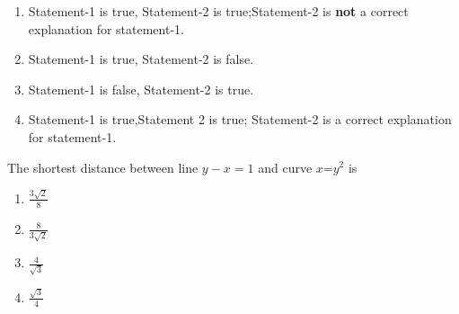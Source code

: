          
            \begin{enumerate}
            
                
            
                \item Statement-1 is true, Statement-2 is true;Statement-2 is \textbf{not} a correct explanation for statement-1. 
        \item Statement-1 is true, Statement-2 is false.  
        \item Statement-1 is false, Statement-2 is true.  
        \item Statement-1 is true,Statement 2 is true; Statement-2 is a correct explanation for statement-1. 
    
        
            \end{enumerate}
           
            
 \item The shortest distance between line $y-x=1$ and curve $x$=$y^2$ is \hfill{}
             \begin{multicols}{4}
            \begin{enumerate}
            
                
    \item $\frac{3\sqrt{2}}{8}$
        \item $\frac{8}{3\sqrt{2}}$
        \item $\frac{4}{\sqrt{3}}$
        \item $\frac{\sqrt{3}}{4}$
        
            \end{enumerate}
            \end{multicols}
            
    
        
        
    
    
